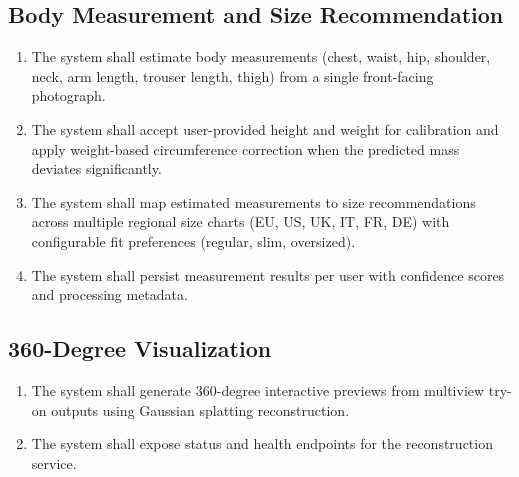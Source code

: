 \subsection{Body Measurement and Size Recommendation}
\begin{enumerate}[leftmargin=*, label=FR-\arabic*., resume]
    \item The system shall estimate body measurements (chest, waist, hip, shoulder, neck, arm length, trouser length, thigh) from a single front-facing photograph.
    \item The system shall accept user-provided height and weight for calibration and apply weight-based circumference correction when the predicted mass deviates significantly.
    \item The system shall map estimated measurements to size recommendations across multiple regional size charts (EU, US, UK, IT, FR, DE) with configurable fit preferences (regular, slim, oversized).
    \item The system shall persist measurement results per user with confidence scores and processing metadata.
\end{enumerate}

\subsection{360-Degree Visualization}
\begin{enumerate}[leftmargin=*, label=FR-\arabic*., resume]
    \item The system shall generate 360-degree interactive previews from multiview try-on outputs using Gaussian splatting reconstruction.
    \item The system shall expose status and health endpoints for the reconstruction service.
\end{enumerate}

